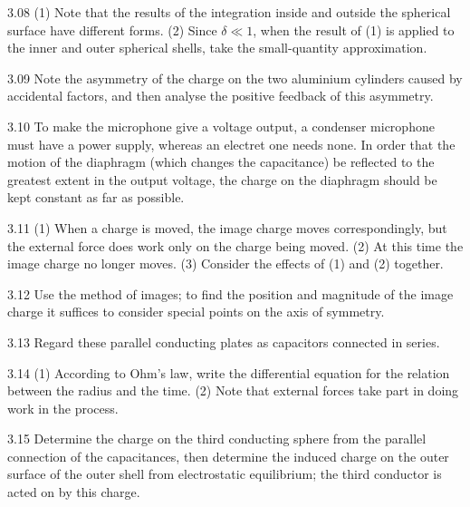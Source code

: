 \begin{hint}{3.08}
(1) Note that the results of the integration inside and outside the spherical surface have different forms. (2) Since $\delta\ll1$, when the result of (1) is applied to the inner and outer spherical shells, take the small-quantity approximation.
\end{hint}

\begin{hint}{3.09}
Note the asymmetry of the charge on the two aluminium cylinders caused by accidental factors, and then analyse the positive feedback of this asymmetry.
\end{hint}

\begin{hint}{3.10}
To make the microphone give a voltage output, a condenser microphone must have a power supply, whereas an electret one needs none. In order that the motion of the diaphragm (which changes the capacitance) be reflected to the greatest extent in the output voltage, the charge on the diaphragm should be kept constant as far as possible.
\end{hint}

\begin{hint}{3.11}
(1) When a charge is moved, the image charge moves correspondingly, but the external force does work only on the charge being moved. (2) At this time the image charge no longer moves. (3) Consider the effects of (1) and (2) together.
\end{hint}

\begin{hint}{3.12}
Use the method of images; to find the position and magnitude of the image charge it suffices to consider special points on the axis of symmetry.
\end{hint}

\begin{hint}{3.13}
Regard these parallel conducting plates as capacitors connected in series.
\end{hint}

\begin{hint}{3.14}
(1) According to Ohm's law, write the differential equation for the relation between the radius and the time. (2) Note that external forces take part in doing work in the process.
\end{hint}

\begin{hint}{3.15}
Determine the charge on the third conducting sphere from the parallel connection of the capacitances, then determine the induced charge on the outer surface of the outer shell from electrostatic equilibrium; the third conductor is acted on by this charge.
\end{hint}

